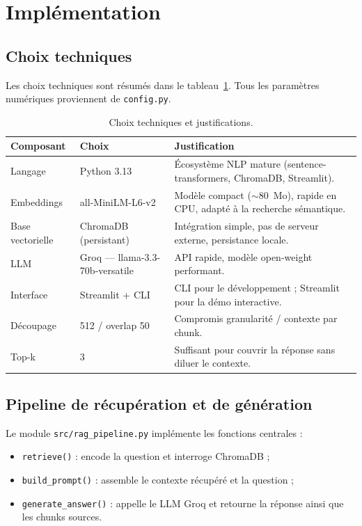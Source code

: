\section{Impl\'ementation}
\label{sec:impl}

\subsection{Choix techniques}

Les choix techniques sont r\'esum\'es dans le tableau~\ref{tab:tech}. Tous les param\`etres
num\'eriques proviennent de \texttt{config.py}.

\begin{table}[H]
  \centering
  \caption{Choix techniques et justifications.}
  \label{tab:tech}
  \small
  \begin{tabular}{@{}p{2.4cm}p{3.2cm}p{7.8cm}@{}}
    \toprule
    \textbf{Composant} & \textbf{Choix} & \textbf{Justification} \\
    \midrule
    Langage & Python 3.13 & \'Ecosyst\`eme NLP mature (sentence-transformers, ChromaDB, Streamlit). \\
    Embeddings & all-MiniLM-L6-v2 & Mod\`ele compact ($\sim$80~Mo), rapide en CPU, adapt\'e \`a la recherche s\'emantique. \\
    Base vectorielle & ChromaDB (persistant) & Int\'egration simple, pas de serveur externe, persistance locale. \\
    LLM & Groq --- llama-3.3-70b-versatile & API rapide, mod\`ele open-weight performant. \\
    Interface & Streamlit + CLI & CLI pour le d\'eveloppement ; Streamlit pour la d\'emo interactive. \\
    D\'ecoupage & 512 / overlap 50 & Compromis granularit\'e / contexte par chunk. \\
    Top-k & 3 & Suffisant pour couvrir la r\'eponse sans diluer le contexte. \\
    \bottomrule
  \end{tabular}
\end{table}

\subsection{Pipeline de r\'ecup\'eration et de g\'en\'eration}

Le module \texttt{src/rag\_pipeline.py} impl\'emente les fonctions centrales :
\begin{itemize}[noitemsep]
  \item \texttt{retrieve()} : encode la question et interroge ChromaDB ;
  \item \texttt{build\_prompt()} : assemble le contexte r\'ecup\'er\'e et la question ;
  \item \texttt{generate\_answer()} : appelle le LLM Groq et retourne la r\'eponse ainsi que
        les chunks sources.
\end{itemize}

